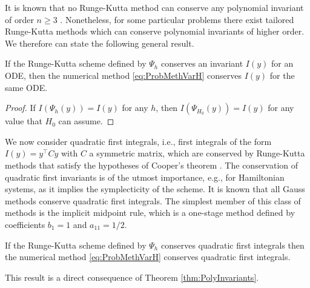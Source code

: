 \documentclass{siamart1116}
\numberwithin{theorem}{section}
\newcommand{\corr}[1]{{\color{bordeaux}#1}}
\begin{document}
It is known that no Runge-Kutta method can conserve any polynomial invariant of order $n \geq 3$ \cite{HLW06}. Nonetheless, for some particular problems there exist tailored Runge-Kutta methods which can conserve polynomial invariants of higher order. We therefore can state the following general result.
\begin{theorem}\label{thm:PolyInvariants} If the Runge-Kutta scheme defined by $\Psi_h$ conserves an invariant $I(y)$ for an ODE, then the numerical method \eqref{eq:ProbMethVarH} conserves $I(y)$ for the same ODE.
\end{theorem}
\begin{proof} If $I(\Psi_h(y)) = I(y)$ for any $h$, then $I(\Psi_{H_0}(y)) = I(y)$ for any value that $H_0$ can assume.
\end{proof}

We now consider quadratic first \corr{integrals, i.e., first integrals of the form $I(y) = y^\top C y$ with $C$ a symmetric matrix}, which are conserved by Runge-Kutta methods that satisfy the hypotheses of Cooper's theorem \cite{HLW06}. The conservation of quadratic first invariants is of the utmost importance, e.g., for Hamiltonian systems, as it implies the symplecticity of the scheme. \corr{It is known \cite{HLW06} that all Gauss methods conserve quadratic first integrals. The simplest member of this class of methods is the implicit midpoint rule, which is a one-stage method defined by coefficients $b_1 = 1$ and $a_{11} = 1/2$.} 
\begin{corollary}\label{thm:QuadraticInvariants} If the Runge-Kutta scheme defined by $\Psi_h$ conserves quadratic first integrals then the numerical method \eqref{eq:ProbMethVarH} conserves quadratic first integrals.
\end{corollary}
This result is a direct consequence of Theorem \ref{thm:PolyInvariants}.
\end{document}
